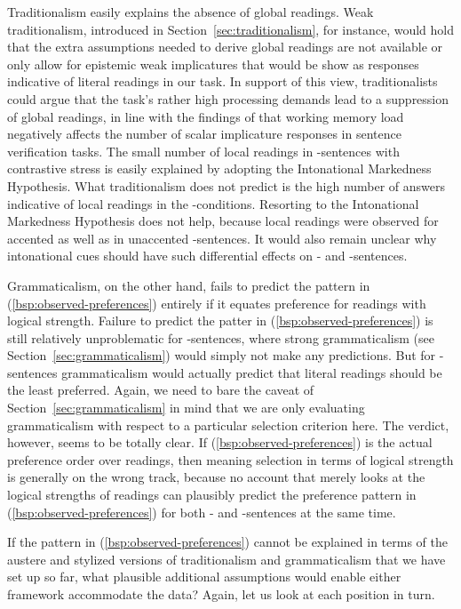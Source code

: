 \documentclass[fleqn,reqno,10pt,draft]{article}
\newcommand{\as}{\acro{as}}
\renewcommand{\es}{\acro{es}}
\begin{document}
Traditionalism easily explains the absence of global readings. Weak
traditionalism, introduced in Section~\ref{sec:traditionalism}, for
instance, would hold that the extra assumptions needed to derive
global readings are not available or only allow for epistemic weak
implicatures that would be show as responses indicative of literal
readings in our task. In support of this view, traditionalists could
argue that the task's rather high processing demands lead to a
suppression of global readings, in line with the findings of
\citet{NeysDe-NeysSchaeken2007:When-People-Are} that working memory
load negatively affects the number of scalar implicature responses in
sentence verification tasks. The small number of local readings in
\as-sentences with contrastive stress is easily explained by adopting
the Intonational Markedness Hypothesis. What traditionalism does not
predict is the high number of answers indicative of local readings in
the \es-conditions. Resorting to the Intonational Markedness
Hypothesis does not help, because local readings were observed for
accented as well as in unaccented \es-sentences. It would also remain
unclear why intonational cues should have such differential effects on
\as- and \es-sentences.

Grammaticalism, on the other hand, fails to predict the pattern in
(\ref{bsp:observed-preferences}) entirely if it equates preference for
readings with logical strength. Failure to predict the patter in
(\ref{bsp:observed-preferences}) is still relatively unproblematic for
\es-sentences, where strong grammaticalism (see
Section~\ref{sec:grammaticalism}) would simply not make any
predictions. But for \as-sentences grammaticalism would actually
predict that literal readings should be the least preferred. Again,
we need to bare the caveat of Section~\ref{sec:grammaticalism} in mind
that we are only evaluating grammaticalism with respect to a
particular selection criterion here. The verdict, however, seems to be
totally clear. If (\ref{bsp:observed-preferences}) is the actual
preference order over readings, then meaning selection in terms of
logical strength is generally on the wrong track, because no account
that merely looks at the logical strengths of readings can plausibly
predict the preference pattern in (\ref{bsp:observed-preferences}) for
both \as- and \es-sentences at the same time.

If the pattern in (\ref{bsp:observed-preferences}) cannot be explained
in terms of the austere and stylized versions of traditionalism and
grammaticalism that we have set up so far, what plausible additional
assumptions would enable either framework accommodate the data? Again,
let us look at each position in turn.
\end{document}
